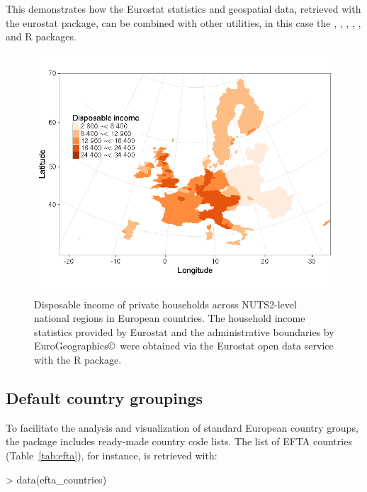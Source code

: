 This demonstrates how the Eurostat statistics and geospatial data,
retrieved with the eurostat package, can be combined with other
utilities, in this case the
 \citep{grid},  \citep{maptools},  \citep{rgdal},
 \citep{rgeos},  \citep{scales}, and
 \citep{stringr} R packages.

\begin{figure}
\begin{center}
\includegraphics{2015-manu-mapexample-1}
\caption{Disposable income of private households across NUTS2-level national regions in European countries. The household income statistics provided by Eurostat and the administrative boundaries by EuroGeographics\copyright \  were obtained via the Eurostat open data service with the  R package.}
\label{fig:mapexample}
\end{center}
\end{figure}


\subsection{Default country groupings}

To facilitate the analysis and visualization of standard European
country groups, the  package includes ready-made
country code lists. The list of EFTA countries (Table~\ref{tab:efta}),
for instance, is retrieved with:

\begin{example}
> data(efta_countries)
\end{example}


